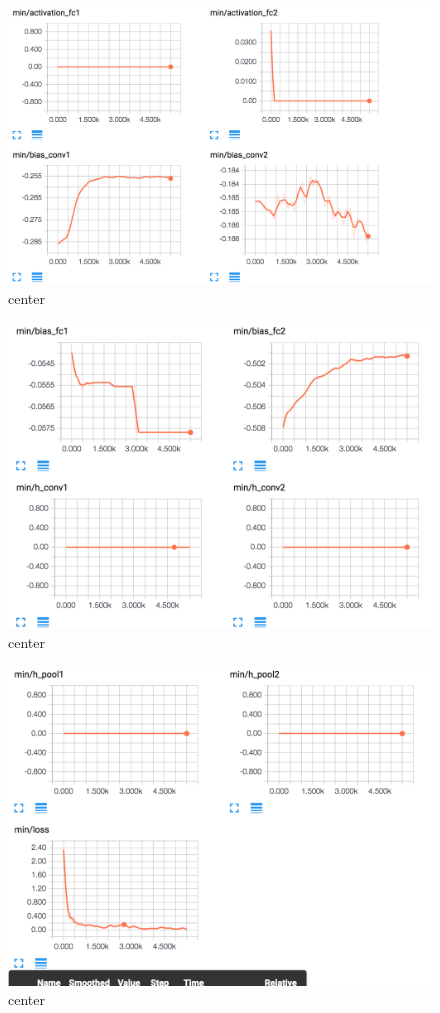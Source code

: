 \documentclass[12pt]{article}
\begin{document}
\begin{figure}[H]
  \caption{center}
  \centering
    \includegraphics[scale=0.3]{bmin2.png}
\end{figure}
\begin{figure}[H]
  \caption{center}
  \centering
    \includegraphics[scale=0.3]{bmin3.png}
\end{figure}
\begin{figure}[H]
  \caption{center}
  \centering
    \includegraphics[scale=0.3]{bmin4.png}
\end{figure}
\end{document}
